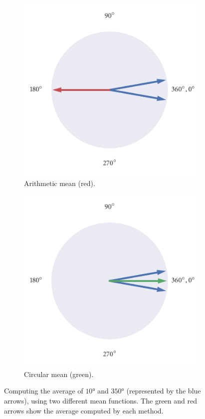 \begin{figure}
	\begin{subfigure}[b]{0.5\textwidth}
		\includegraphics{arith_mean.pdf}
		\caption{Arithmetic mean (red).}
		\label{subfig:arith_mean}
	\end{subfigure}%
	\begin{subfigure}[b]{0.5\textwidth}
		\includegraphics{circ_mean.pdf}
		\caption{Circular mean (green).}
		\label{subfig:circ_mean}
	\end{subfigure}
    \caption{Computing the average of $\ang{10}$ and $\ang{350}$ (represented by the blue
    arrows), using two different mean functions. The green and red arrows show the
    average computed by each method.}
	\label{fig:visualise_mean}
\end{figure}

